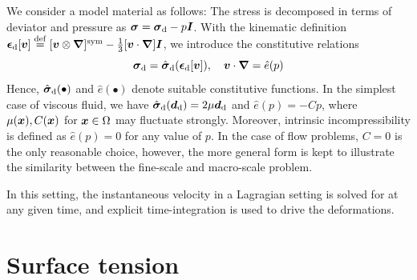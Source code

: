 \documentclass[MikaelDissertation.tex]{subfiles}
\begin{document}
We consider a model material as follows: The stress is decomposed in terms of deviator and pressure as $\boldsymbol{\sigma} = \boldsymbol{\sigma}_{\mathrm{d}} - p\boldsymbol{I}$.
With the kinematic definition $\boldsymbol{\epsilon}_{\mathrm{d}}[\boldsymbol{v}]\overset{\mathrm{def}}{=}[\boldsymbol{v}\mathbin{\otimes}\boldsymbol{\nabla}]^{\mathrm{sym}}-\frac{1}{3}[\boldsymbol{v}\cdot\boldsymbol{\nabla}]\boldsymbol{I}$, we introduce the constitutive relations
\begin{equation}
    \boldsymbol{\sigma}_{\mathrm{d}} = \hat{\boldsymbol{\sigma}}_{\mathrm{d}}(\boldsymbol{\epsilon}_{\mathrm{d}}[\boldsymbol{v}]), \quad
    \boldsymbol{v}\cdot\boldsymbol{\nabla} = \hat{e}(p)
\label{eq201}
\end{equation}
Hence, $\hat{\boldsymbol{\sigma}}_{\mathrm{d}}(\bullet)$ and $\hat{e}(\bullet)$ denote suitable constitutive functions.
In the simplest case of viscous fluid, we have $\hat{\boldsymbol{\sigma}}_{\mathrm{d}}(\boldsymbol{d}_{\mathrm{d}})=2\mu\boldsymbol{d}_{\mathrm{d}}$ and $\hat{e}(p)=- C p$, where $\mu(\boldsymbol{x}), C(\boldsymbol{x})$ for $\boldsymbol{x}\in\Omega$ may fluctuate strongly.
Moreover, intrinsic incompressibility is defined as $\hat{e}(p)=0$ for any value of $p$.
In the case of flow problems, $C = 0$ is the only reasonable choice, however, the more general form is kept to illustrate the similarity between the fine-scale and macro-scale problem.

In this setting, the instantaneous velocity in a Lagragian setting is solved for at any given time, and explicit time-integration is used to drive the deformations.


\section{Surface tension}
\end{document}
